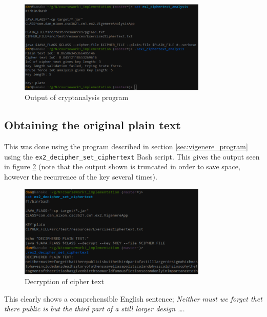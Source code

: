 \documentclass[a4paper]{article}
\begin{document}
\begin{figure}[h!]
  \centering
  \includegraphics[width=0.8\textwidth]{graphics/ex2_cryptanalysis_output.eps}
  \caption{Output of cryptanalysis program}
  \label{fig:cryptanalysis_output}
\end{figure}

\subsection{Obtaining the original plain text}

This was done using the program described in section \ref{sec:vigenere_program}
using the \texttt{ex2\_decipher\_set\_ciphertext} Bash script. This gives the
output seen in figure \ref{fig:plaintext_output} (note that the output shown
is truncated in order to save space, however the recurrence of the key several
times).

\begin{figure}[h!]
  \centering
  \includegraphics[width=0.8\textwidth]{graphics/ex2_plaintext_output.eps}
  \caption{Decryption of cipher text}
  \label{fig:plaintext_output}
\end{figure}

This clearly shows a comprehensible English sentence; \textit{Neither must we
forget thet there public is but the third part of a still larger design \ldots}.
\end{document}
